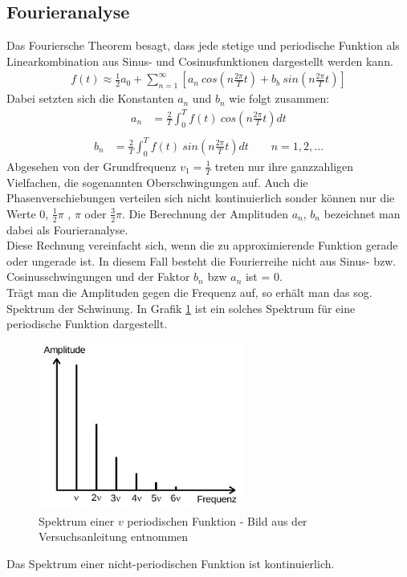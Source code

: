 \subsection{Fourieranalyse}
Das Fouriersche Theorem besagt, dass jede stetige und periodische Funktion als Linearkombination aus Sinus- und Cosinusfunktionen dargestellt werden kann. 
\begin{align}
f(t)\approx \frac{1}{2} a_0 + \sum^\infty_{n=1} \left[ a_n~cos\left(n\frac{2\pi}{T}t\right)+ b_b~ sin\left(n\frac{2\pi}{T}t\right)\right]
\label{eq_fanalyse}
\end{align}
Dabei setzten sich die Konstanten $a_n$ und $b_n$ wie folgt zusammen:
\begin{align}
 a_n&=\frac{2}{T}\int^T_{0} f(t)~cos\left(n\frac{2\pi}{T}t\right) dt\\
 \label{eq_an}
 \end{align}
 \begin{align}
 b_n&=\frac{2}{T}\int^T_{0} f(t)~sin\left(n\frac{2\pi}{T}t\right) dt \qquad n=1,2,...
 \label{eq_bn}
\end{align}
Abgesehen von der Grundfrequenz $v_1 =\frac{1}{T}$ treten nur ihre ganzzahligen Vielfachen, die sogenannten Oberschwingungen auf. Auch die Phasenverschiebungen verteilen sich nicht kontinuierlich sonder können nur die Werte 0, $\frac{1}{2}\pi$ , $\pi$ oder $\frac{3}{2}\pi$. Die Berechnung der Amplituden $a_n$, $b_n$ bezeichnet man dabei als Fourieranalyse.\\
Diese Rechnung vereinfacht sich, wenn die zu approximierende Funktion gerade oder ungerade ist. In diesem Fall besteht die Fourierreihe nicht aus Sinus- bzw. Cosinusschwingungen und der Faktor $b_n$ bzw $a_n$ ist = 0.\\
Trägt man die Amplituden gegen die Frequenz auf, so erhält man das sog. Spektrum der Schwinung. In Grafik \ref{pic_spec} ist ein solches Spektrum für eine periodische Funktion dargestellt. 
\begin{figure}[htbp]
\includegraphics[width=0.6\textwidth]{pics/amplitude_frequenz.jpeg}
\caption{Spektrum einer $v$ periodischen Funktion - Bild aus der Versuchsanleitung entnommen}
\label{pic_spec}
\end{figure} Das Spektrum einer nicht-periodischen Funktion ist kontinuierlich.\\

